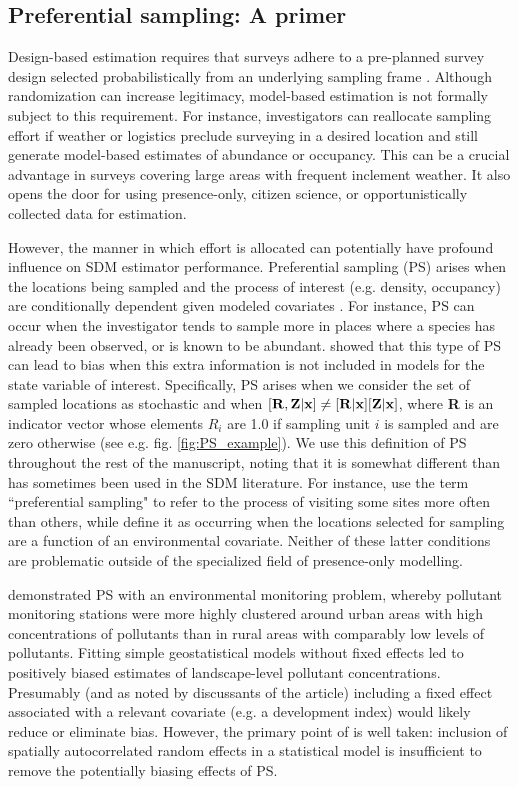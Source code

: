 \documentclass[times,mee,doublespace,]{besauth2}
\begin{document}
\subsection{Preferential sampling: A primer}

Design-based estimation requires that surveys adhere to a pre-planned survey design selected probabilistically from an underlying sampling frame \citep{Cochran1977}.  Although randomization can increase legitimacy, model-based estimation is not formally subject to this requirement.  For instance, investigators can reallocate sampling effort if weather or logistics preclude surveying in a desired location and still generate model-based estimates of abundance or occupancy.  This can be a crucial advantage in surveys covering large areas with frequent inclement weather.  It also opens the door for using presence-only, citizen science, or opportunistically collected data for estimation.

However, the manner in which effort is allocated can potentially have profound influence on SDM estimator performance.   Preferential sampling (PS) arises when the locations being sampled and the process of interest (e.g. density, occupancy) are conditionally dependent given modeled covariates \citep{DiggleEtAl2010}.  For instance, PS can occur when the investigator tends to sample more in places where a species has already been observed, or is known to be abundant. \citet{DiggleEtAl2010} showed that this type of PS can lead to bias when this extra information is not included in models for the state variable of interest.  Specifically, PS arises when we consider the set of sampled locations as stochastic and when $[{\bf R},{\bf Z} | {\bf x}] \neq [{\bf R}|{\bf x}][{\bf Z}|{\bf x}]$, where \textbf{R} is an indicator vector whose elements $R_i$ are 1.0 if sampling unit $i$ is sampled and are zero otherwise (see e.g. fig. \ref{fig:PS_example}).  We use this definition of PS throughout the rest of the manuscript, noting that it is somewhat different than has sometimes been used in the SDM literature.  For instance, \citet{MerckxEtAl2011} use the term ``preferential sampling" to refer to the process of visiting some sites more often than others, while \citet{ManceurKuhn2014} define it as occurring when the locations selected for sampling are a function of an environmental covariate.  Neither of these latter conditions are problematic outside of the specialized field of presence-only modelling.

\citet{DiggleEtAl2010} demonstrated PS with an environmental monitoring problem, whereby pollutant monitoring stations were more highly clustered around urban areas with high concentrations of pollutants than in rural areas with comparably low levels of pollutants.  Fitting simple geostatistical models without fixed effects led to positively biased estimates of landscape-level pollutant concentrations.  Presumably (and as noted by discussants of the article) including a fixed effect associated with a relevant covariate (e.g. a development index) would likely reduce or eliminate bias.  However, the primary point of \citet{DiggleEtAl2010} is well taken: inclusion of spatially autocorrelated random effects in a statistical model is insufficient to remove the potentially biasing effects of PS.
\end{document}
